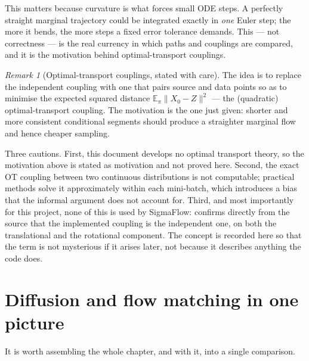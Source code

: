 \documentclass[11pt,a4paper]{report}
\theoremstyle{definition}
\theoremstyle{remark}
\newtheorem{remark}[remark]{Remark}
\newcommand{\EE}{\mathbb E}
\begin{document}
This matters because curvature is what forces small ODE steps. A perfectly
straight marginal trajectory could be integrated exactly in \emph{one}
Euler step; the more it bends, the more steps a fixed error tolerance
demands. This --- not correctness --- is the real currency in which paths
and couplings are compared, and it is the motivation behind
optimal-transport couplings.

\begin{remark}[Optimal-transport couplings, stated with care]
\label{rem:ot-couplings}
The idea is to replace the independent coupling with one that pairs source
and data points so as to minimise the expected squared distance
$\EE_\pi\|X_0-Z\|^2$ --- the (quadratic) optimal-transport coupling. The
motivation is the one just given: shorter and more consistent conditional
segments should produce a straighter marginal flow and hence cheaper
sampling.

Three cautions. First, this document develops no optimal transport theory,
so the motivation above is stated as motivation and not proved here.
Second, the exact OT coupling between two continuous distributions is not
computable; practical methods solve it approximately within each
mini-batch, which introduces a bias that the informal argument does not
account for. Third, and most importantly for this project, none of this is
used by SigmaFlow:  confirms directly from the source
that the implemented coupling is the independent one, on both the
translational and the rotational component. The concept is recorded here so
that the term is not mysterious if it arises later, not because it
describes anything the code does.
\end{remark}

\section{Diffusion and flow matching in one picture}
\label{sec:fm-diffusion-synthesis}

It is worth assembling the whole chapter, and 
with it, into a single comparison.
\end{document}
